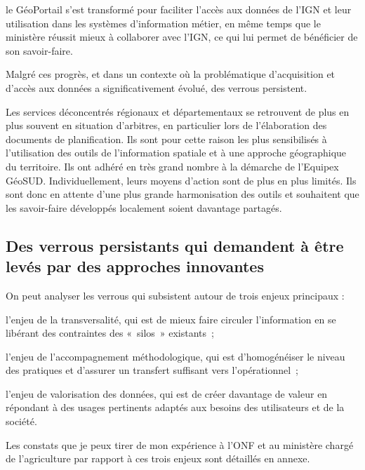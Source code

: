\item le GéoPortail s'est transformé pour faciliter l'accès aux données de l'IGN et
leur utilisation dans les systèmes d'information métier, en même temps que le
ministère réussit mieux à collaborer avec l'IGN, ce qui lui permet de
bénéficier de son savoir-faire.

\stopitemize

Malgré ces progrès, et dans un contexte où la problématique d'acquisition et
d'accès aux données a significativement évolué, des verrous persistent.

Les services déconcentrés régionaux et départementaux se retrouvent de plus en
plus souvent en situation d’arbitres, en particulier lors de l’élaboration des
documents de planification. Ils sont pour cette raison les plus sensibilisés à
l’utilisation des outils de l’information spatiale et à une approche
géographique du territoire. Ils ont adhéré en très grand nombre à la démarche
de l’Equipex GéoSUD. Individuellement, leurs moyens d’action sont de plus en
plus limités. Ils sont donc en attente d’une plus grande harmonisation des
outils et souhaitent que les savoir-faire développés localement soient
davantage partagés.

\subsection
{Des verrous persistants qui demandent à être levés par des approches
innovantes}

On peut analyser les verrous qui subsistent autour de trois enjeux principaux
:

\startitemize

\item l'enjeu de la transversalité, qui est de mieux faire circuler l'information en
se libérant des contraintes des « silos » existants ;

\item l'enjeu de l'accompagnement méthodologique, qui est d'homogénéiser le niveau
des pratiques et d'assurer un transfert suffisant vers l'opérationnel ;

\item l'enjeu de valorisation des données, qui est de créer davantage de valeur en
répondant à des usages pertinents adaptés aux besoins des utilisateurs et de
la société.

\stopitemize

Les constats que je peux tirer de mon expérience à l'ONF et au ministère
chargé de l'agriculture par rapport à ces trois enjeux sont détaillés en
annexe.

